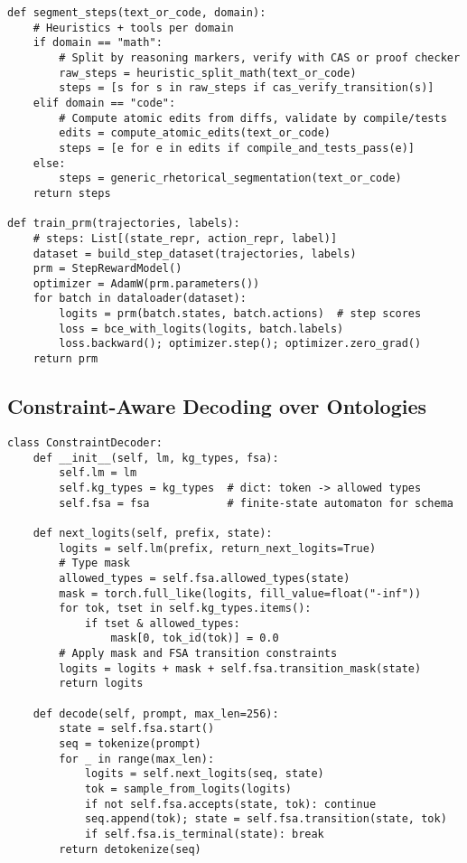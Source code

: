 \documentclass{article}
\begin{document}
\begin{lstlisting}[style=py, caption={Semantic step segmentation and PRM scoring.}]
def segment_steps(text_or_code, domain):
    # Heuristics + tools per domain
    if domain == "math":
        # Split by reasoning markers, verify with CAS or proof checker
        raw_steps = heuristic_split_math(text_or_code)
        steps = [s for s in raw_steps if cas_verify_transition(s)]
    elif domain == "code":
        # Compute atomic edits from diffs, validate by compile/tests
        edits = compute_atomic_edits(text_or_code)
        steps = [e for e in edits if compile_and_tests_pass(e)]
    else:
        steps = generic_rhetorical_segmentation(text_or_code)
    return steps

def train_prm(trajectories, labels):
    # steps: List[(state_repr, action_repr, label)]
    dataset = build_step_dataset(trajectories, labels)
    prm = StepRewardModel()
    optimizer = AdamW(prm.parameters())
    for batch in dataloader(dataset):
        logits = prm(batch.states, batch.actions)  # step scores
        loss = bce_with_logits(logits, batch.labels)
        loss.backward(); optimizer.step(); optimizer.zero_grad()
    return prm
\end{lstlisting}

\subsection{Constraint-Aware Decoding over Ontologies}
\begin{lstlisting}[style=py, caption={Type-aware logit masking with FSA-based constraints.}]
class ConstraintDecoder:
    def __init__(self, lm, kg_types, fsa):
        self.lm = lm
        self.kg_types = kg_types  # dict: token -> allowed types
        self.fsa = fsa            # finite-state automaton for schema

    def next_logits(self, prefix, state):
        logits = self.lm(prefix, return_next_logits=True)
        # Type mask
        allowed_types = self.fsa.allowed_types(state)
        mask = torch.full_like(logits, fill_value=float("-inf"))
        for tok, tset in self.kg_types.items():
            if tset & allowed_types:
                mask[0, tok_id(tok)] = 0.0
        # Apply mask and FSA transition constraints
        logits = logits + mask + self.fsa.transition_mask(state)
        return logits

    def decode(self, prompt, max_len=256):
        state = self.fsa.start()
        seq = tokenize(prompt)
        for _ in range(max_len):
            logits = self.next_logits(seq, state)
            tok = sample_from_logits(logits)
            if not self.fsa.accepts(state, tok): continue
            seq.append(tok); state = self.fsa.transition(state, tok)
            if self.fsa.is_terminal(state): break
        return detokenize(seq)
\end{lstlisting}
\end{document}
